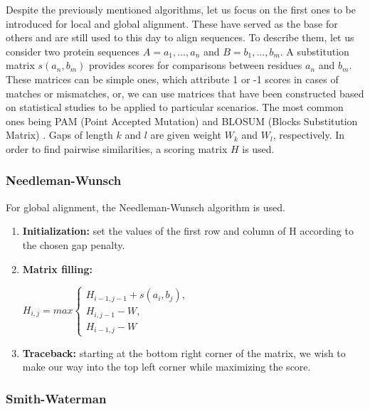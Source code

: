 Despite the previously mentioned algorithms, let us focus on the first ones to be introduced for local and global alignment. These have served as the base for others and are still used to this day to align sequences. To describe them, let us consider two protein sequences $A = a_{1},...,a_{n}$ and $B = b_{1},...,b_{m}$. A substitution matrix $s(a_{n},b_{m})$ provides scores for comparisons between residues $a_{n}$ and $b_{m}$. These matrices can be simple ones, which attribute 1 or -1 scores in cases of matches or mismatches, or, we can use matrices that have been constructed based on statistical studies to be applied to particular scenarios. The most common ones being PAM (Point Accepted Mutation) \cite{dayhoff197822} and BLOSUM (Blocks Substitution Matrix) \cite{henikoff1992amino}. Gaps of length $k$ and $l$ are given weight $W_{k}$ and $W_{l}$, respectively. In order to find pairwise similarities, a scoring matrix $ H $ is used. 

\subsubsection{Needleman-Wunsch}

For global alignment, the Needleman-Wunsch \cite{needleman1970general} algorithm is used.

\begin{enumerate}
	\item \textbf{Initialization:} set the values of the first row and column of H according to the chosen gap penalty.
	
	\item \textbf{Matrix filling:}
		\begin{center}
			$H_{i,j} = max\begin{cases}H_{i-1,j-1} + s(a_{i},b_{j}), 
			\\  H_{i,j-1}- W,
			\\  H_{i-1,j}- W \end{cases}$
		\end{center}	
	
	\item \textbf{Traceback:} starting at the bottom right corner of the matrix, we wish to make our way into the top left corner while maximizing the score.
\end{enumerate}

\subsubsection{Smith-Waterman}

